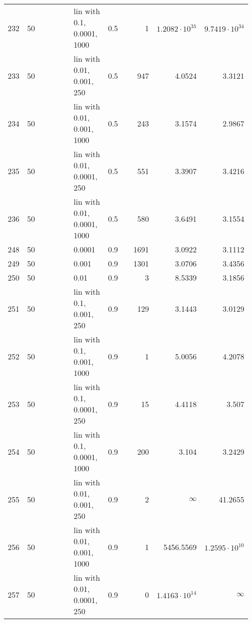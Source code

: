 \begin{longtable}{lrrrrrlrrrrr}
  232 &      50 &   &   &   &   &  lin with 0.1, 0.0001, 1000 &      0.5 &        &       1 &  $1.2082\cdot 10^{35}$ &  $9.7419\cdot 10^{34}$ \\
  233 &      50 &   &   &   &   &   lin with 0.01, 0.001, 250 &      0.5 &        &     947 &                 4.0524 &                 3.3121 \\
  234 &      50 &   &   &   &   &  lin with 0.01, 0.001, 1000 &      0.5 &        &     243 &                 3.1574 &                 2.9867 \\
  235 &      50 &   &   &   &   &  lin with 0.01, 0.0001, 250 &      0.5 &        &     551 &                 3.3907 &                 3.4216 \\
  236 &      50 &   &   &   &   & lin with 0.01, 0.0001, 1000 &      0.5 &        &     580 &                 3.6491 &                 3.1554 \\
  248 &      50 &   &   &   &   &                      0.0001 &      0.9 &        &    1691 &                 3.0922 &                 3.1112 \\
  249 &      50 &   &   &   &   &                       0.001 &      0.9 &        &    1301 &                 3.0706 &                 3.4356 \\
  250 &      50 &   &   &   &   &                        0.01 &      0.9 &        &       3 &                 8.5339 &                 3.1856 \\
  251 &      50 &   &   &   &   &    lin with 0.1, 0.001, 250 &      0.9 &        &     129 &                 3.1443 &                 3.0129 \\
  252 &      50 &   &   &   &   &   lin with 0.1, 0.001, 1000 &      0.9 &        &       1 &                 5.0056 &                 4.2078 \\
  253 &      50 &   &   &   &   &   lin with 0.1, 0.0001, 250 &      0.9 &        &      15 &                 4.4118 &                  3.507 \\
  254 &      50 &   &   &   &   &  lin with 0.1, 0.0001, 1000 &      0.9 &        &     200 &                  3.104 &                 3.2429 \\
  255 &      50 &   &   &   &   &   lin with 0.01, 0.001, 250 &      0.9 &        &       2 &               $\infty$ &                41.2655 \\
  256 &      50 &   &   &   &   &  lin with 0.01, 0.001, 1000 &      0.9 &        &       1 &              5456.5569 &  $1.2595\cdot 10^{10}$ \\
  257 &      50 &   &   &   &   &  lin with 0.01, 0.0001, 250 &      0.9 &        &       0 &  $1.4163\cdot 10^{14}$ &               $\infty$ \\

\end{longtable}
